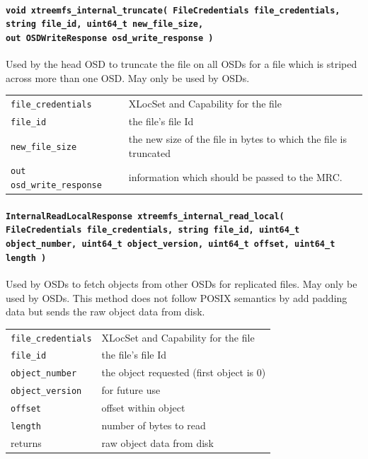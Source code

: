 \paragraph{\texttt{void xtreemfs\_internal\_truncate( FileCredentials file\_credentials, string file\_id, uint64\_t new\_file\_size,\\out OSDWriteResponse osd\_write\_response~)}}
Used by the head OSD to truncate the file on all OSDs for a file which is striped across more than one OSD. May only be used by OSDs.

\begin{tabularx}{\textwidth}{lX}
 \texttt{file\_credentials} & XLocSet and Capability for the file\\
 \texttt{file\_id} & the file's file Id\\
 \texttt{new\_file\_size} & the new size of the file in bytes to which the file is truncated\\
 \texttt{out osd\_write\_response} & information which should be passed to the MRC\index{MRC}.\\
\end{tabularx}



\paragraph{\texttt{InternalReadLocalResponse xtreemfs\_internal\_read\_local( FileCredentials file\_credentials, string file\_id, uint64\_t object\_number, uint64\_t object\_version, uint64\_t offset, uint64\_t length~)}}
Used by OSDs to fetch objects from other OSDs for replicated files. May only be used by OSDs. This method does not follow POSIX semantics by add padding data but sends the raw object data from disk.

\begin{tabularx}{\textwidth}{lX}
 \texttt{file\_credentials} & XLocSet and Capability for the file\\
 \texttt{file\_id} & the file's file Id\\
 \texttt{object\_number} & the object requested (first object is 0)\\
 \texttt{object\_version} & for future use\\
 \texttt{offset} & offset within object\\
 \texttt{length} & number of bytes to read\\
 returns & raw object data from disk\\
\end{tabularx}



